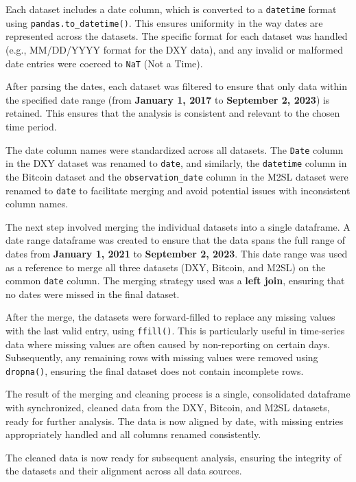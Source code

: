 Each dataset includes a date column, which is converted to a \texttt{datetime} format using \texttt{pandas.to\_datetime()}.
This ensures uniformity in the way dates are represented across the datasets. The specific format for each dataset was
handled (e.g., MM/DD/YYYY format for the DXY data), and any invalid or malformed date entries were coerced to \texttt{NaT}
(Not a Time).

After parsing the dates, each dataset was filtered to ensure that only data within the specified date range (from
\textbf{January 1, 2017} to \textbf{September 2, 2023}) is retained. This ensures that the analysis is consistent and
relevant to the chosen time period.

The date column names were standardized across all datasets. The \texttt{Date} column in the DXY dataset was renamed to
\texttt{date}, and similarly, the \texttt{datetime} column in the Bitcoin dataset and the \texttt{observation\_date}
column in the M2SL dataset were renamed to \texttt{date} to facilitate merging and avoid potential issues with inconsistent
column names.

The next step involved merging the individual datasets into a single dataframe. A date range dataframe was created to
ensure that the data spans the full range of dates from \textbf{January 1, 2021} to \textbf{September 2, 2023}. This date
range was used as a reference to merge all three datasets (DXY, Bitcoin, and M2SL) on the common \texttt{date} column.
The merging strategy used was a \textbf{left join}, ensuring that no dates were missed in the final dataset.

After the merge, the datasets were forward-filled to replace any missing values with the last valid entry, using
\texttt{ffill()}. This is particularly useful in time-series data where missing values are often caused by non-reporting on
certain days. Subsequently, any remaining rows with missing values were removed using \texttt{dropna()}, ensuring the final
dataset does not contain incomplete rows.

The result of the merging and cleaning process is a single, consolidated dataframe with synchronized, cleaned data from
the DXY, Bitcoin, and M2SL datasets, ready for further analysis. The data is now aligned by date, with missing entries
appropriately handled and all columns renamed consistently.

The cleaned data is now ready for subsequent analysis, ensuring the integrity of the datasets and their alignment across
all data sources.

